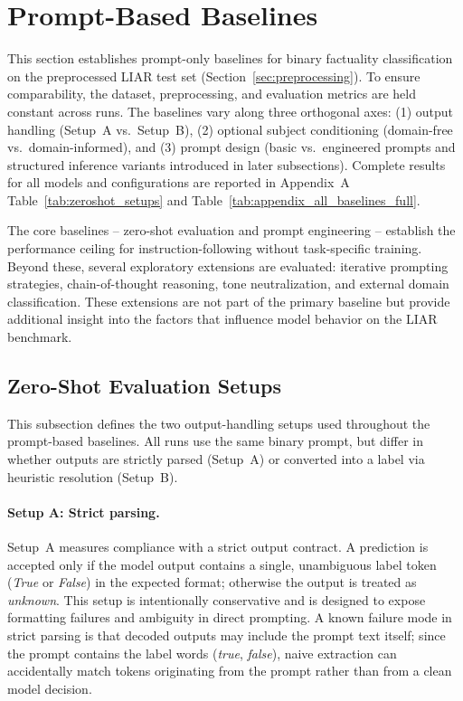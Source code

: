 \section{Prompt-Based Baselines}
\label{sec:prompt_baselines}

This section establishes prompt-only baselines for binary factuality classification on the preprocessed LIAR test set (Section~\ref{sec:preprocessing}). To ensure comparability, the dataset, preprocessing, and evaluation metrics are held constant across runs. The baselines vary along three orthogonal axes: (1) output handling (Setup~A vs.\ Setup~B), (2) optional subject conditioning (domain-free vs.\ domain-informed), and (3) prompt design (basic vs.\ engineered prompts and structured inference variants introduced in later subsections). Complete results for all models and configurations are reported in Appendix~A Table~\ref{tab:zeroshot_setups} and Table~\ref{tab:appendix_all_baselines_full}.

The core baselines -- zero-shot evaluation and prompt engineering -- establish the performance ceiling for instruction-following without task-specific training. Beyond these, several exploratory extensions are evaluated: iterative prompting strategies, chain-of-thought reasoning, tone neutralization, and external domain classification. These extensions are not part of the primary baseline but provide additional insight into the factors that influence model behavior on the LIAR benchmark.

\subsection{Zero-Shot Evaluation Setups}
This subsection defines the two output-handling setups used throughout the prompt-based baselines. 
All runs use the same binary prompt, but differ in whether outputs are strictly parsed (Setup~A) or converted into a label via heuristic resolution (Setup~B).

\paragraph{Setup A: Strict parsing.}
Setup~A measures compliance with a strict output contract. A prediction is accepted only if the model output contains a single, unambiguous label token (\textit{True} or \textit{False}) in the expected format; otherwise the output is treated as \textit{unknown}. 
This setup is intentionally conservative and is designed to expose formatting failures and ambiguity in direct prompting. 
A known failure mode in strict parsing is that decoded outputs may include the prompt text itself; since the prompt contains the label words (\textit{true}, \textit{false}), naive extraction can accidentally match tokens originating from the prompt rather than from a clean model decision. 

